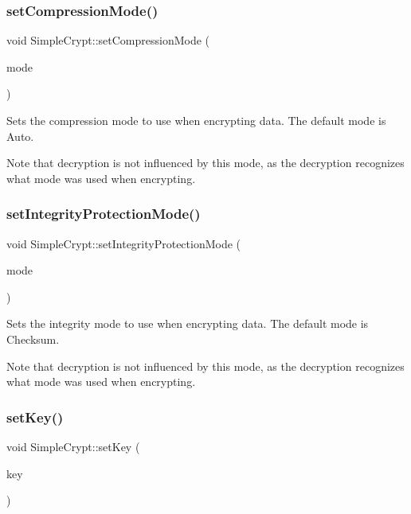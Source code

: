 \subsubsection{\texorpdfstring{setCompressionMode()}{setCompressionMode()}}
{\footnotesize\ttfamily void Simple\+Crypt\+::set\+Compression\+Mode (\begin{DoxyParamCaption}\item[{\mbox{\hyperlink{class_simple_crypt_a25298e746f175cf175a18f082092ca8e}{Compression\+Mode}}}]{mode }\end{DoxyParamCaption})\hspace{0.3cm}{\ttfamily [inline]}}

Sets the compression mode to use when encrypting data. The default mode is Auto.

Note that decryption is not influenced by this mode, as the decryption recognizes what mode was used when encrypting. \mbox{\label{class_simple_crypt_a4fef5e6d3246ee57d6a7b68475b12b8b}} 
\subsubsection{\texorpdfstring{setIntegrityProtectionMode()}{setIntegrityProtectionMode()}}
{\footnotesize\ttfamily void Simple\+Crypt\+::set\+Integrity\+Protection\+Mode (\begin{DoxyParamCaption}\item[{\mbox{\hyperlink{class_simple_crypt_a42a5172e558d346b28421cc4e85feb2d}{Integrity\+Protection\+Mode}}}]{mode }\end{DoxyParamCaption})\hspace{0.3cm}{\ttfamily [inline]}}

Sets the integrity mode to use when encrypting data. The default mode is Checksum.

Note that decryption is not influenced by this mode, as the decryption recognizes what mode was used when encrypting. \mbox{\label{class_simple_crypt_aa7aad9ed2e88b883ba9214c7d9928745}} 
\subsubsection{\texorpdfstring{setKey()}{setKey()}}
{\footnotesize\ttfamily void Simple\+Crypt\+::set\+Key (\begin{DoxyParamCaption}\item[{quint64}]{key }\end{DoxyParamCaption})}

